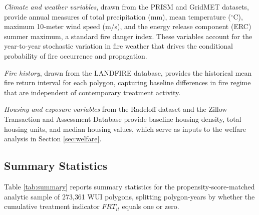\documentclass[12pt, letterpaper]{article}
\begin{document}
\textit{Climate and weather variables}, drawn from the PRISM and GridMET datasets, provide annual measures of total precipitation (mm), mean temperature ($^\circ$C), maximum 10-meter wind speed (m/s), and the energy release component (ERC) summer maximum, a standard fire danger index. These variables account for the year-to-year stochastic variation in fire weather that drives the conditional probability of fire occurrence and propagation.

\textit{Fire history}, drawn from the LANDFIRE database, provides the historical mean fire return interval for each polygon, capturing baseline differences in fire regime that are independent of contemporary treatment activity.

\textit{Housing and exposure variables} from the Radeloff dataset and the Zillow Transaction and Assessment Database provide baseline housing density, total housing units, and median housing values, which serve as inputs to the welfare analysis in Section \ref{sec:welfare}.

\subsection{Summary Statistics}

Table \ref{tab:summary} reports summary statistics for the propensity-score-matched analytic sample of 273{,}361 WUI polygons, splitting polygon-years by whether the cumulative treatment indicator $FRT_{it}$ equals one or zero.
\end{document}
